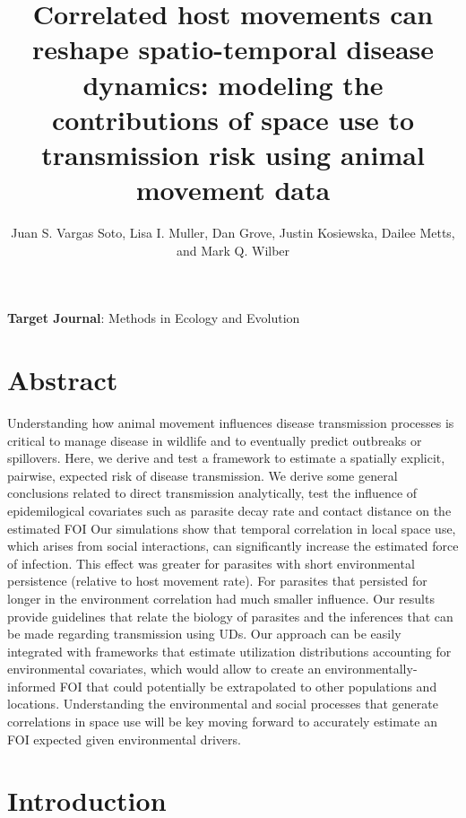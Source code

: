 \documentclass[letterpaper]{article}
\title{Correlated host movements can reshape spatio-temporal disease dynamics: modeling the contributions of space use to transmission risk using animal movement data}
\author{Juan S. Vargas Soto, Lisa I. Muller, Dan Grove, Justin Kosiewska, Dailee Metts, and Mark Q. Wilber}
\affil{School of Natural Resources, University of Tennessee, Knoxville, TN}
\date{}
\begin{document}
\maketitle

\noindent
\textbf{Target Journal}: Methods in Ecology and Evolution

\section*{Abstract}

Understanding how animal movement influences disease transmission processes is critical to manage disease in wildlife and to eventually predict outbreaks or spillovers. 
Here, we derive and test a framework to estimate a spatially explicit, pairwise, expected risk of disease transmission. We derive some general conclusions related to direct transmission analytically, test the influence of epidemilogical covariates such as parasite decay rate and contact distance on the estimated FOI
Our simulations show that temporal correlation in local space use, which arises from social interactions, can significantly increase the estimated force of infection. This effect was greater for parasites with short environmental persistence (relative to host movement rate). For parasites that persisted for longer in the environment correlation had much smaller influence.  Our results provide guidelines that relate the biology of parasites and the inferences that can be made regarding transmission using UDs. 
Our approach can be easily integrated with frameworks that estimate utilization distributions accounting for environmental covariates, which would allow to create an environmentally-informed FOI that could potentially be extrapolated to other populations and locations. Understanding the environmental and social processes that generate correlations in space use will be key moving forward to accurately estimate an FOI expected given environmental drivers. 

\section*{Introduction}


\end{document}
